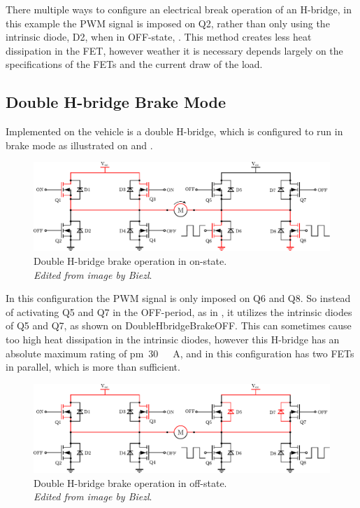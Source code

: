There multiple ways to configure an electrical break operation of an H-bridge, in this example the PWM signal is imposed on Q2, rather than only using the intrinsic diode, D2, when in OFF-state,  \cite{DCook}. This method creates less heat dissipation in the FET, however weather it is necessary depends largely on the specifications of the FETs and the current draw of the load.

\subsection{Double H-bridge Brake Mode}
Implemented on the vehicle is a double H-bridge, which is configured to run in brake mode as illustrated on  and . 

\begin{figure}[H]
	\centering
	\includegraphics[scale=.6]{figures/DoubleHbridgeBrakeON.pdf}
	\caption{Double H-bridge brake operation in on-state.\\ \emph{Edited from image by Biezl}.\cite{Biezl}}
	\label{DoubleHbridgeBrakeON}
\end{figure}\vspace{-5mm}

In this configuration the PWM signal is only imposed on Q6 and Q8. So instead of activating Q5 and Q7 in the OFF-period, as in , it utilizes the intrinsic diodes of Q5 and Q7, as shown on \figurename{DoubleHbridgeBrakeOFF}. This can sometimes cause too high heat dissipation in the intrinsic diodes, however this H-bridge has an absolute maximum rating of \si{\pm 30 \ A}, and in this configuration has two FETs in parallel, which is more than sufficient\cite{STMicroelectronics}.

\begin{figure}[H]
	\centering
	\includegraphics[scale=.6]{figures/DoubleHbridgeBrakeOFF.pdf}
	\caption{Double H-bridge brake operation in off-state.\\ \emph{Edited from image by Biezl}.\cite{Biezl}}
	\label{DoubleHbridgeBrakeOFF}
\end{figure}\vspace{-5mm}

